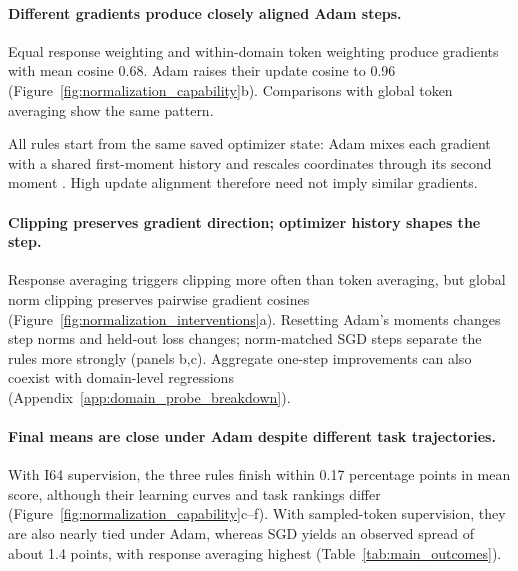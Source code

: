 \paragraph{Different gradients produce closely aligned Adam steps.}
Equal response weighting and within-domain token weighting produce gradients with mean cosine 0.68. Adam raises their update cosine to 0.96 (Figure~\ref{fig:normalization_capability}b). Comparisons with global token averaging show the same pattern.

All rules start from the same saved optimizer state: Adam mixes each gradient with a shared first-moment history and rescales coordinates through its second moment \citep{kingma2015adam}. High update alignment therefore need not imply similar gradients.

\paragraph{Clipping preserves gradient direction; optimizer history shapes the step.}
Response averaging triggers clipping more often than token averaging, but global norm clipping preserves pairwise gradient cosines (Figure~\ref{fig:normalization_interventions}a). Resetting Adam's moments changes step norms and held-out loss changes; norm-matched SGD steps separate the rules more strongly (panels b,c). Aggregate one-step improvements can also coexist with domain-level regressions (Appendix~\ref{app:domain_probe_breakdown}).



\paragraph{Final means are close under Adam despite different task trajectories.}
With I64 supervision, the three rules finish within 0.17 percentage points in mean score, although their learning curves and task rankings differ (Figure~\ref{fig:normalization_capability}c--f). With sampled-token supervision, they are also nearly tied under Adam, whereas SGD yields an observed spread of about 1.4 points, with response averaging highest (Table~\ref{tab:main_outcomes}).

